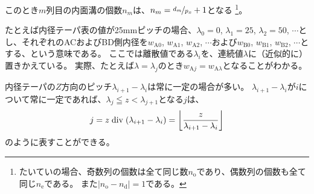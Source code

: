 このとき$m$列目の内面溝の個数$n_m$は、$n_m = \nicefrac{d_m}{p_x}+1$となる
\footnote{\label{fn:generallyDimpleN}
たいていの場合、奇数列の個数は全て同じ数$n_\mathrm o$であり、偶数列の個数も全て同じ$n_\mathrm e$である。
また$|n_\mathrm o-n_\mathrm d| = 1$である。}。
\begin{hosoku}[label=hosoku:example4taper]
たとえば内径テーパ表の値が25mmピッチの場合、$\lambda_0=0$, $\lambda_1=25$, $\lambda_2=50$, $\cdots$とし、それぞれのACおよびBD側内径を$w_{\mathrm A0}$, $w_{\mathrm A1}$, $w_{\mathrm A2}$, $\cdots$および$w_{\mathrm B0}$, $w_{\mathrm B1}$, $w_{\mathrm B2}$, $\cdots$とする、という意味である。
ここでは離散値である$\lambda_i$を、連続値$\lambda$に（近似的に）置きかえている。
実際、たとえば$\lambda = \lambda_j$のとき$w_{\mathrm Aj} = w_{\mathrm A\lambda}$となることがわかる。
\end{hosoku}\relax
\begin{hosoku}
内径テーパの$Z$方向のピッチ$\lambda_{i+1}-\lambda_i$は常に一定の場合が多い。
$\lambda_{i+1}-\lambda_i$が$i$について常に一定であれば、$\lambda_j \leqq z < \lambda_{j+1}$となる$j$は、
\begin{align*}
  j = z \bDiv (\lambda_{i+1}-\lambda_i) = \left\lfloor\frac z{\lambda_{i+1}-\lambda_i}\right\rfloor
\end{align*}
のように表すことができる。
\end{hosoku}
